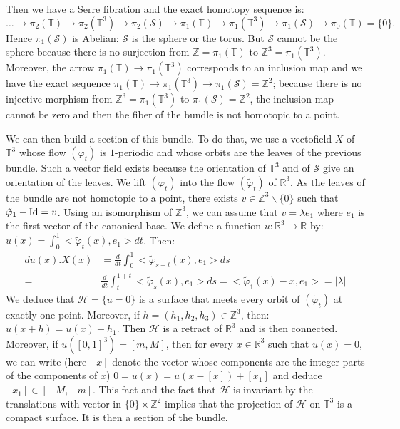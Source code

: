 \documentclass{dcds}
\theoremstyle{definition}
\begin{document}
 Then we have a Serre fibration and the exact homotopy sequence is:
 $$
\ldots \rightarrow \pi_2({\mathbb {T}} )\rightarrow \pi_2({\mathbb {T}}^3)\rightarrow  \pi_2({\mathcal {S}})\rightarrow \pi_1({\mathbb {T}})\rightarrow \pi_1({\mathbb {T}}^3)\rightarrow \pi_1({\mathcal {S}})\rightarrow \pi_0({\mathbb {T}})=\{0\}.
$$
Hence $\pi_1({\mathcal {S}})$ is Abelian: ${\mathcal {S}}$ is the sphere or the torus. But ${\mathcal {S}}$ cannot be the sphere because there is no surjection from ${\mathbb {Z}}=\pi_1({\mathbb {T}})$ to ${\mathbb {Z}}^3=\pi_1({\mathbb {T}}^3)$. Moreover, the arrow $\pi_1({\mathbb {T}})\rightarrow \pi_1({\mathbb {T}}^3)$ corresponds to an inclusion map and we have the exact sequence $\pi_1({\mathbb {T}})\rightarrow\pi_1({\mathbb {T}}^3)\rightarrow \pi_1({\mathcal {S}})={\mathbb {Z}}^2$; because there is no injective morphism from ${\mathbb {Z}}^3=\pi_1({\mathbb {T}}^3)$ to $\pi_1({\mathcal {S}})={\mathbb {Z}}^2$,  the inclusion map cannot be zero and then the fiber of the bundle is not homotopic to a point.

We can then build a section of this bundle. To do that, we use a vectofield $X$ of ${\mathbb {T}}^3$  whose flow $(\varphi_t)$ is $1$-periodic and whose orbits are the leaves of the previous bundle. Such a vector field exists because the orientation of ${\mathbb {T}}^3$ and of ${\mathcal {S}}$ give an orientation of the leaves.  We lift $(\varphi_t)$ into the flow $(\tilde\varphi_t)$ of ${\mathbb {R}}^3$. As the leaves of the bundle are not homotopic to a point, there exists $v\in {\mathbb {Z}}^3\backslash\{ 0\}$ such that $\tilde\varphi_1-{\rm Id}=v$. Using an isomorphism of ${\mathbb {Z}}^3$, we can assume that $v=\lambda e_1$ where $e_1$ is the first vector of the canonical base.
We define a function $u:{\mathbb {R}}^3\rightarrow {\mathbb {R}}$ by: $u(x)=\int_0^1<\tilde \varphi_t(x), e_1>dt$. Then:
\begin{equation*}\begin{split}du(x).X(x)&=\frac{d}{dt}\int_0^1<\tilde \varphi_{s+t}(x), e_1>ds\\
 =&\frac{d}{dt}\int_t^{1+t}<\tilde \varphi_s(x), e_1>ds=<\tilde\varphi_1(x)-x,e_1>=|\lambda |\end{split}\end{equation*}
We deduce that ${\mathcal {H}}=\{ u=0\}$ is a   surface that meets every orbit of $(\tilde \varphi_t)$ at exactly one point. Moreover, if $h=(h_1, h_2, h_3)\in {\mathbb {Z}}^3$, then: $u(x+h)=u(x)+h_1$. Then ${\mathcal {H}}$ is a retract of ${\mathbb {R}}^3$ and is then connected. Moreover, if $u([0, 1]^3)=[m, M]$, then for every $x\in {\mathbb {R}}^3$ such that $u(x)=0$, we can write (here $[x]$ denote the vector whose components are the integer parts of the components of $x$)
$0=u(x)=u(x-[x])+[x_1]$ and deduce $[x_1]\in [-M, -m]$. This fact and the fact that ${\mathcal {H}}$ is invariant by the translations with vector in $\{ 0\}\times {\mathbb {Z}}^2$ implies that the projection of ${\mathcal {H}}$ on ${\mathbb {T}}^3$ is a compact surface. It is then a section of the bundle.
\end{document}
